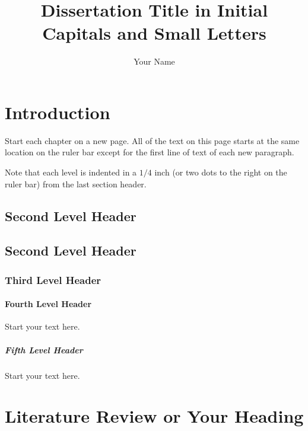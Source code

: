 \documentclass[debug, font=Times]{gw-dissertation}[2021/11/19]
\title{Dissertation Title in Initial Capitals and Small Letters}
\author{Your Name}
\begin{document}
\chapter{Introduction}

Start each chapter on a new page. All of the text on this page starts at the same location on the
ruler bar except for the first line of text of each new paragraph.

Note that each level is indented in a $1/4$ inch (or two dots to the right on the ruler bar) from
the last section header. 

    \section{Second Level Header}
    \lipsum[3]

    \section{Second Level Header}
    \lipsum[4]

        \subsection{Third Level Header}
        \lipsum[5-6]

            \subsubsection{Fourth Level Header}
            Start your text here.

                \paragraph{Fifth Level Header}
                Start your text here.

\chapter{Literature Review or Your Heading}
\end{document}
